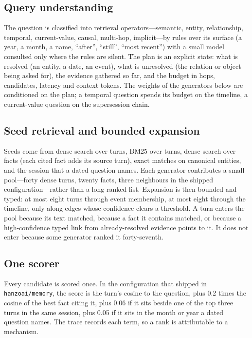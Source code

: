 \documentclass[11pt]{article}
\begin{document}
\subsection{Query understanding}

The question is classified into retrieval operators---semantic, entity,
relationship, temporal, current-value, causal, multi-hop, implicit---by
rules over its surface (a year, a month, a name, ``after'', ``still'',
``most recent'') with a small model consulted only where the rules are
silent. The plan is an explicit state: what is resolved (an entity, a date,
an event), what is unresolved (the relation or object being asked for),
the evidence gathered so far, and the budget in hops, candidates, latency
and context tokens. The weights of the generators below are conditioned on
the plan; a temporal question spends its budget on the timeline, a
current-value question on the supersession chain.

\subsection{Seed retrieval and bounded expansion}

Seeds come from dense search over turns, BM25 over turns, dense search over
facts (each cited fact adds its source turn), exact matches on canonical
entities, and the session that a dated question names. Each generator
contributes a small pool---forty dense turns, twenty facts, three
neighbours in the shipped configuration---rather than a long ranked list.
Expansion is then bounded and typed: at most eight turns through event
membership, at most eight through the timeline, only along edges whose
confidence clears a threshold. A turn enters the pool because its text
matched, because a fact it contains matched, or because a high-confidence
typed link from already-resolved evidence points to it. It does not enter
because some generator ranked it forty-seventh.

\subsection{One scorer}

Every candidate is scored once. In the configuration that shipped in
\texttt{hanzoai/memory}, the score is the turn's cosine to the question,
plus 0.2 times the cosine of the best fact citing it, plus 0.06 if it sits
beside one of the top three turns in the same session, plus 0.05 if it sits
in the month or year a dated question names. The trace records each term,
so a rank is attributable to a mechanism.
\end{document}
